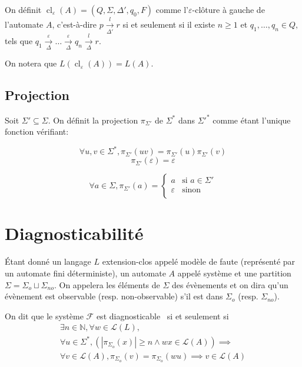 \documentclass[10pt,a4paper]{article}
\begin{document}
On définit  $\operatorname{cl}_\varepsilon(A) = (Q, \Sigma, \Delta', q_0, F)$ comme l'$\varepsilon$-clôture \`a gauche de l'automate $A$, c'est-\`a-dire $p \underset{\Delta'}{\overset{l}{{\to}}} r$ si et seulement si il existe $n\ge 1$ et $q_1,\dots,q_n \in Q,$ tels que $q_1 \underset{\Delta}{\overset{\varepsilon}{{\to}}} \dots \underset{\Delta}{\overset{\varepsilon}{{\to}}} q_n \underset{\Delta}{\overset{l}{{\to}}} r$.

On notera que $L(\operatorname{cl}_\varepsilon(A))=L(A)$.

\subsection{Projection}

Soit $\Sigma'\subseteq \Sigma$. On d\'efinit la projection $\pi_{\Sigma'}$ de $\Sigma^*$ dans $\Sigma'^*$ comme \'etant l'unique fonction v\'erifiant:

$$\forall u,v \in \Sigma^*, \pi_{\Sigma'}(uv)=\pi_{\Sigma'}(u)\pi_{\Sigma'}(v)$$
$$\pi_{\Sigma'}(\varepsilon)=\varepsilon$$

$$\forall a\in \Sigma,\pi_{\Sigma'}(a)=\left\{\begin{array}{ll}
a &\text{si } a\in \Sigma'\\
\varepsilon &\text{sinon} \\
\end{array}\right.$$

\section{Diagnosticabilit\'e}

\'Etant donn\'e un langage $L$ extension-clos appel\'e mod\`ele de faute (repr\'esent\'e par un automate fini d\'eterministe), un automate $A$ appel\'e syst\`eme et une partition $\Sigma=\Sigma_o\sqcup \Sigma_{no}$. On appelera les \'el\'ements de $\Sigma$ des \'ev\`enements et on dira qu'un \'ev\`enement est observable (resp. non-observable) s'il est dans $\Sigma_o$ (resp. $\Sigma_{no}$).

On dit que le système $\mathcal F$ est diagnosticable~\cite{SamSRST96}  si et seulement si $$\begin{array}{l}
\exists n \in \mathbb N, \forall w \in \mathcal L(L),\\
\forall u \in \Sigma^*, \left(\left|\pi_{\Sigma_o}(x)\right|\ge n \land wx \in \mathcal L(A)\right) \implies\\
\forall v \in \mathcal L(A), \pi_{\Sigma_o}(v)=\pi_{\Sigma_o}(wu) \implies v \in \mathcal L(A)
\end{array}$$
\end{document}
